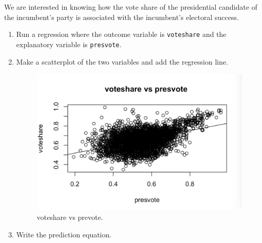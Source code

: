\documentclass[12pt,letterpaper]{article}
\begin{document}
\noindent We are interested in knowing how the vote share of the presidential candidate of the incumbent's party is associated with the incumbent's electoral success.
	\vspace{.25cm}
	\begin{enumerate}
		\item Run a regression where the outcome variable is \texttt{voteshare} and the explanatory variable is \texttt{presvote}.
			  
		\item Make a scatterplot of the two variables and add the regression line.
			   
		\begin{figure}[h!]
			\includegraphics[width=\linewidth]{PS33}
			\caption{voteshare vs prevote.}
			\label{fig:PS33}
		\end{figure}
		\item Write the prediction equation.
			  
	\end{enumerate}
	

\newpage	
\end{document}
